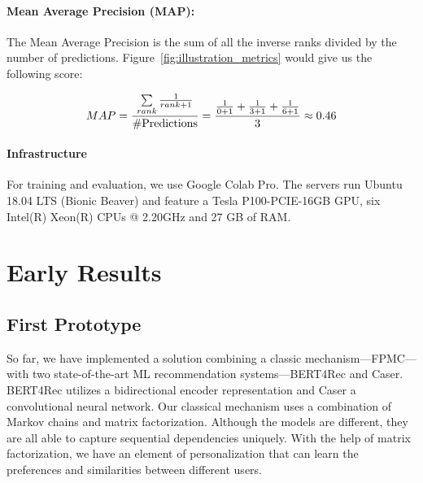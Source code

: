\paragraph{Mean Average Precision (MAP):}
The Mean Average Precision is the sum of all the inverse ranks divided by the number of predictions. Figure~\ref{fig:illustration_metrics} would give us the following score:

\begin{equation}
\setlength{\jot}{25pt}
    \begin{aligned}
        MAP=\frac{ \sum\limits_{rank}
      \frac{1}{rank + 1}}
      {\text{\#Predictions}} = \frac{\frac{1}{0+1} +\frac{1}{3+1} + \frac{1}{6+1}}{3} \approx 0.46
    \end{aligned}
    \label{equation:MAP}
\end{equation}


\paragraph{Infrastructure}
For training and evaluation, we use Google Colab Pro. The servers run Ubuntu 18.04 LTS (Bionic Beaver) and feature a Tesla P100-PCIE-16GB GPU, six Intel(R) Xeon(R) CPUs @ 2.20GHz and 27 GB of RAM. 



\section{Early Results}

\subsection{First Prototype}

So far, we have implemented a solution combining a classic mechanism---FPMC---with two state-of-the-art ML recommendation systems---BERT4Rec and Caser. BERT4Rec utilizes a bidirectional encoder representation and Caser a convolutional neural network. Our classical mechanism uses a combination of Markov chains and matrix factorization. Although the models are different, they are all able to capture sequential dependencies uniquely. With the help of matrix factorization, we have an element of personalization that can learn the preferences and similarities between different users.

